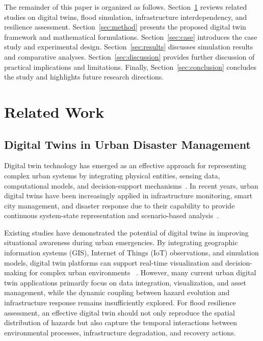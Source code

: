 \documentclass[preprint,12pt]{elsarticle}
\begin{document}
The remainder of this paper is organized as follows. Section~\ref{sec:rw}
reviews related studies on digital twins, flood simulation, infrastructure
interdependency, and resilience assessment. Section~\ref{sec:method}
presents the proposed digital twin framework and mathematical formulations.
Section~\ref{sec:case} introduces the case study and experimental design.
Section~\ref{sec:results} discusses simulation results and comparative
analyses. Section~\ref{sec:discussion} provides further discussion of
practical implications and limitations. Finally, Section~\ref{sec:conclusion}
concludes the study and highlights future research directions.

\section{Related Work}\label{sec:rw}

\subsection{Digital Twins in Urban Disaster Management}
Digital twin technology has emerged as an effective approach for representing
complex urban systems by integrating physical entities, sensing data,
computational models, and decision-support mechanisms~\cite{grieves2017digital,
tao2019digital}. In recent years, urban digital twins have been increasingly
applied in infrastructure monitoring, smart city management, and disaster
response due to their capability to provide continuous system-state
representation and scenario-based analysis~\cite{batty2018digital}.

Existing studies have demonstrated the potential of digital twins in
improving situational awareness during urban emergencies. By integrating
geographic information systems (GIS), Internet of Things (IoT) observations,
and simulation models, digital twin platforms can support real-time
visualization and decision-making for complex urban environments
~\cite{haklay2008openstreetmap}. However, many current urban digital twin
applications primarily focus on data integration, visualization, and asset
management, while the dynamic coupling between hazard evolution and
infrastructure response remains insufficiently explored. For flood resilience
assessment, an effective digital twin should not only reproduce the spatial
distribution of hazards but also capture the temporal interactions between
environmental processes, infrastructure degradation, and recovery actions.
\end{document}
